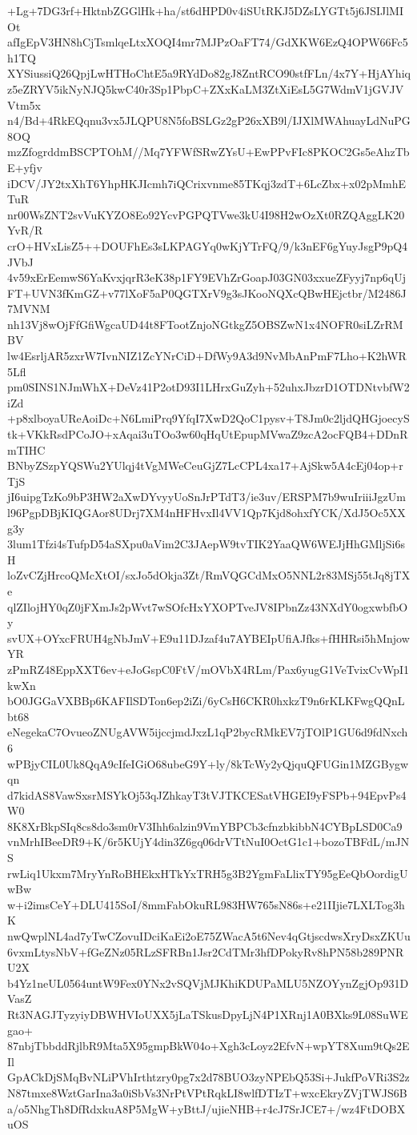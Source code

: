 +Lg+7DG3rf+HktnbZGGlHk+ha/st6dHPD0v4iSUtRKJ5DZsLYGTt5j6JSIJlMIOt
afIgEpV3HN8hCjTsmlqeLtxXOQI4mr7MJPzOaFT74/GdXKW6EzQ4OPW66Fc5h1TQ
XYSiussiQ26QpjLwHTHoChtE5a9RYdDo82gJ8ZntRCO90stfFLn/4x7Y+HjAYhiq
z5eZRYV5ikNyNJQ5kwC40r3Sp1PbpC+ZXxKaLM3ZtXiEsL5G7WdmV1jGVJVVtm5x
n4/Bd+4RkEQqnu3vx5JLQPU8N5foBSLGz2gP26xXB9l/IJXlMWAhuayLdNuPG8OQ
mzZfogrddmBSCPTOhM//Mq7YFWfSRwZYsU+EwPPvFIc8PKOC2Gs5eAhzTbE+yfjv
iDCV/JY2txXhT6YhpHKJIcmh7iQCrixvnme85TKqj3zdT+6LcZbx+x02pMmhETuR
nr00WsZNT2svVuKYZO8Eo92YcvPGPQTVwe3kU4I98H2wOzXt0RZQAggLK20YvR/R
crO+HVxLisZ5++DOUFhEs3sLKPAGYq0wKjYTrFQ/9/k3nEF6gYuyJsgP9pQ4JVbJ
4v59xErEemwS6YaKvxjqrR3eK38p1FY9EVhZrGoapJ03GN03xxueZFyyj7np6qUj
FT+UVN3fKmGZ+v77lXoF5aP0QGTXrV9g3sJKooNQXcQBwHEjctbr/M2486J7MVNM
nh13Vj8wOjFfGfiWgcaUD44t8FTootZnjoNGtkgZ5OBSZwN1x4NOFR0siLZrRMBV
lw4EsrljAR5zxrW7IvnNIZ1ZcYNrCiD+DfWy9A3d9NvMbAnPmF7Lho+K2hWR5Lfl
pm0SINS1NJmWhX+DeVz41P2otD93I1LHrxGuZyh+52uhxJbzrD1OTDNtvbfW2iZd
+p8xlboyaUReAoiDc+N6LmiPrq9YfqI7XwD2QoC1pysv+T8Jm0c2ljdQHGjoecyS
tk+VKkRsdPCoJO+xAqai3uTOo3w60qHqUtEpupMVwaZ9zcA2ocFQB4+DDnRmTIHC
BNbyZSzpYQSWu2YUlqj4tVgMWeCeuGjZ7LcCPL4xa17+AjSkw5A4cEj04op+rTjS
jI6uipgTzKo9bP3HW2aXwDYvyyUoSnJrPTdT3/ie3uv/ERSPM7b9wuIriiiJgzUm
l96PgpDBjKIQGAor8UDrj7XM4nHFHvxIl4VV1Qp7Kjd8ohxfYCK/XdJ5Oc5XXg3y
3lum1Tfzi4sTufpD54aSXpu0aVim2C3JAepW9tvTIK2YaaQW6WEJjHhGMljSi6sH
loZvCZjHrcoQMcXtOI/sxJo5dOkja3Zt/RmVQGCdMxO5NNL2r83MSj55tJq8jTXe
qlZIlojHY0qZ0jFXmJs2pWvt7wSOfcHxYXOPTveJV8IPbnZz43NXdY0ogxwbfbOy
svUX+OYxcFRUH4gNbJmV+E9u11DJzaf4u7AYBEIpUfiAJfks+fHHRsi5hMnjowYR
zPmRZ48EppXXT6ev+eJoGspC0FtV/mOVbX4RLm/Pax6yugG1VeTvixCvWpI1kwXn
bO0JGGaVXBBp6KAFIlSDTon6ep2iZi/6yCsH6CKR0hxkzT9n6rKLKFwgQQnLbt68
eNegekaC7OvueoZNUgAVW5ijccjmdJxzL1qP2bycRMkEV7jTOlP1GU6d9fdNxch6
wPBjyCIL0Uk8QqA9cIfeIGiO68ubeG9Y+ly/8kTcWy2yQjquQFUGin1MZGBygwqn
d7kidAS8VawSxsrMSYkOj53qJZhkayT3tVJTKCESatVHGEI9yFSPb+94EpvPs4W0
8K8XrBkpSIq8cs8do3sm0rV3Ihh6alzin9VmYBPCb3cfnzbkibbN4CYBpLSD0Ca9
vnMrhIBeeDR9+K/6r5KUjY4din3Z6gq06drVTtNuI0OctG1c1+bozoTBFdL/mJNS
rwLiq1Ukxm7MryYnRoBHEkxHTkYxTRH5g3B2YgmFaLlixTY95gEeQbOordigUwBw
w+i2imsCeY+DLU415SoI/8mmFabOkuRL983HW765sN86s+e21IIjie7LXLTog3hK
nwQwplNL4ad7yTwCZovuIDciKaEi2oE75ZWacA5t6Nev4qGtjscdwsXryDsxZKUu
6vxmLtysNbV+fGeZNz05RLzSFRBn1Jsr2CdTMr3hfDPokyRv8hPN58b289PNRU2X
b4Yz1neUL0564untW9Fex0YNx2vSQVjMJKhiKDUPaMLU5NZOYynZgjOp931DVasZ
Rt3NAGJTyzyiyDBWHVIoUXX5jLaTSkusDpyLjN4P1XRnj1A0BXks9L08SuWEgao+
87nbjTbbddRjlbR9Mta5X95gmpBkW04o+Xgh3cLoyz2EfvN+wpYT8Xum9tQs2EIl
GpACkDjSMqBvNLiPVhIrthtzry0pg7x2d78BUO3zyNPEbQ53Si+JukfPoVRi3S2z
N87tmxe8WztGarIna3a0iSbVs3NrPtVPtRqkLI8wlfDTIzT+wxcEkryZVjTWJS6B
a/o5NhgTh8DfRdxkuA8P5MgW+yBttJ/ujieNHB+r4cJ7SrJCE7+/wz4FtDOBXuOS
